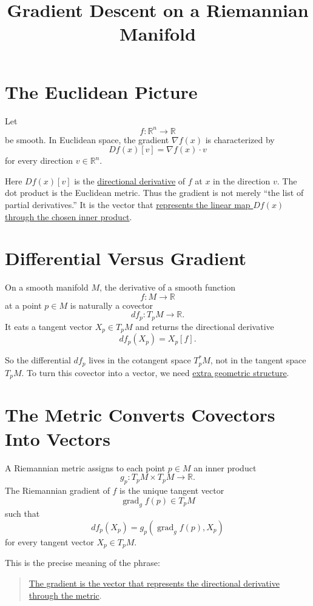 \documentclass[11pt]{article}
\title{Gradient Descent on a Riemannian Manifold}
\author{}
\date{}
\begin{document}
\maketitle

\section*{The Euclidean Picture}

Let
\[
f:\mathbb R^n\to\mathbb R
\]
be smooth. In Euclidean space, the gradient $\nabla f(x)$ is characterized by
\[
Df(x)[v]
=
\nabla f(x)\cdot v
\]
for every direction $v\in\mathbb R^n$.

Here $Df(x)[v]$ is the
\href{directional_derivative.html}{directional derivative} of $f$ at $x$ in
the direction $v$. The dot product is the Euclidean metric. Thus the gradient
is not merely ``the list of partial derivatives.'' It is the vector that
\href{gradient_represents_derivative.html}{represents the linear map $Df(x)$
through the chosen inner product}.

\section*{Differential Versus Gradient}

On a smooth manifold $M$, the derivative of a smooth function
\[
f:M\to\mathbb R
\]
at a point $p\in M$ is naturally a covector
\[
df_p:T_pM\to\mathbb R.
\]
It eats a tangent vector $X_p\in T_pM$ and returns the directional derivative
\[
df_p(X_p)=X_p[f].
\]

So the differential $df_p$ lives in the cotangent space $T_p^*M$, not in the
tangent space $T_pM$. To turn this covector into a vector, we need
\href{metric_needed_for_gradient.html}{extra geometric structure}.

\section*{The Metric Converts Covectors Into Vectors}

A Riemannian metric assigns to each point $p\in M$ an inner product
\[
g_p:T_pM\times T_pM\to\mathbb R.
\]
The Riemannian gradient of $f$ is the unique tangent vector
\[
\operatorname{grad}_g f(p)\in T_pM
\]
such that
\[
df_p(X_p)
=
g_p(\operatorname{grad}_g f(p),X_p)
\]
for every tangent vector $X_p\in T_pM$.

This is the precise meaning of the phrase:
\begin{quote}
\href{gradient_represents_derivative.html}{The gradient is the vector that
represents the directional derivative through the metric}.
\end{quote}
\end{document}

